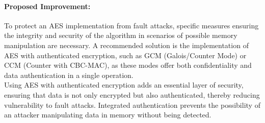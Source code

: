 \documentclass[12pt]{article}
\begin{document}
    \paragraph{Proposed Improvement:}
    To protect an AES implementation from fault attacks, specific measures ensuring the integrity and security of the algorithm in scenarios of possible memory manipulation are necessary. A recommended solution is the implementation of AES with authenticated encryption, such as GCM (Galois/Counter Mode) or CCM (Counter with CBC-MAC), as these modes offer both confidentiality and data authentication in a single operation.
    \\
    Using AES with authenticated encryption adds an essential layer of security, ensuring that data is not only encrypted but also authenticated, thereby reducing vulnerability to fault attacks. Integrated authentication prevents the possibility of an attacker manipulating data in memory without being detected.

\end{document}
